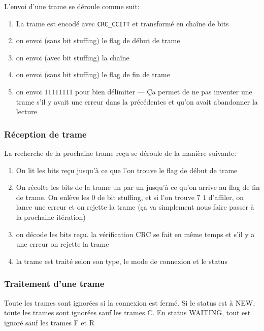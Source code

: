 \documentclass{article}
\begin{document}
    L'envoi d'une trame se déroule comme suit:
    \begin{enumerate}
        \item La trame est encodé avec \verb#CRC_CCITT# et transformé en chaîne de bits
        \item on envoi (sans bit stuffing) le flag de début de trame
        \item on envoi (avec bit stuffing) la chaîne
        \item on envoi (sans bit stuffing) le flag de fin de trame
        \item on envoi $11111111$ pour bien délimiter --- Ça permet de ne pas inventer une trame s'il y avait une erreur dans la précédentes et qu'on avait abandonner la lecture
    \end{enumerate}

    \subsubsection{Réception de trame}
    La recherche de la prochaine trame reçu se déroule de la manière suivante:
    \begin{enumerate}
        \item On lit les bits reçu jusqu'à ce que l'on trouve le flag de début de trame
        \item On récolte les bits de la trame un par un jusqu'à ce qu'on arrive au flag de fin de trame. On enlève les $0$ de bit stuffing, et si l'on trouve 7 $1$ d'affiler, on lance une erreur et on rejette la trame (ça va simplement nous faire passer à la prochaine itération)
        \item on décode les bits reçu. la vérification CRC se fait en même temps et s'il y a une erreur on rejette la trame
        \item la trame est traité selon son type, le mode de connexion et le status
    \end{enumerate}

    \subsubsection{Traitement d'une trame}
    Toute les trames sont ignorées si la connexion est fermé. Si le status est à NEW, toute les trames sont ignorées sauf les trames C. En status WAITING, tout est ignoré sauf les trames F et R
\end{document}
